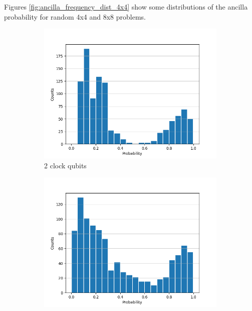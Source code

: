 \documentclass[12pt]{extarticle}
\begin{document}
Figures \ref{fig:ancilla_frequency_dist_4x4} show some distributions of the ancilla probability for random 4x4 and 8x8 problems.

\begin{figure}[htbp]
    \centering
    \captionsetup[subfigure]{labelformat=empty}
    \begin{subfigure}[b]{0.45\textwidth}
        \centering
        \includegraphics[width=\textwidth]{images/ancilla_frequency_dist_4x4b3.png}
        \caption{2 clock qubits}
    \end{subfigure}
    \hfill
    \begin{subfigure}[b]{0.45\textwidth}
        \centering
        \includegraphics[width=\textwidth]{images/ancilla_frequency_dist_4x4b4.png}

\end{subfigure}
\end{figure}
\end{document}
